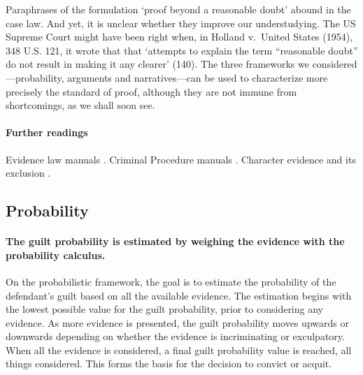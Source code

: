\documentclass[10pt]{article}
\begin{document}
Paraphrases of the formulation `proof beyond a reasonable doubt' 
abound in the case law. And yet, it is unclear 
whether they improve our understudying. The US Supreme Court might have been right when, in Holland v.\ United States (1954), 348 U.S. 121, 
it wrote that that `attempts to explain the term ``reasonable doubt'' do not result in making it any clearer' (140).
The three frameworks we considered---probability, arguments and narratives---can be used to characterize 
more precisely the standard of proof, although they are not immune from shortcomings, 
as we shall soon see.


\paragraph{Further readings}
Evidence law manuals  \citep{fisher2008,  mendez2008}. 
Criminal Procedure manuals \citep{allenEtAl2011}.
Character evidence and its exclusion \citep{redmayne2015}.
 

 
 




\subsection{Probability}


\paragraph{The guilt probability is estimated by weighing  the evidence with the probability calculus.}

 On the probabilistic framework, the goal is to estimate the probability of the defendant's guilt based 
 on all the available evidence. The estimation begins with the lowest possible value 
for the guilt probability, prior to considering any evidence. As more evidence is presented, the guilt probability 
moves upwards or downwards depending on whether the evidence is incriminating or exculpatory. 
When all the evidence is considered, a final guilt probability value is 
reached, all things considered. This forms the basis for 
the decision to convict or acquit. 
\end{document}
